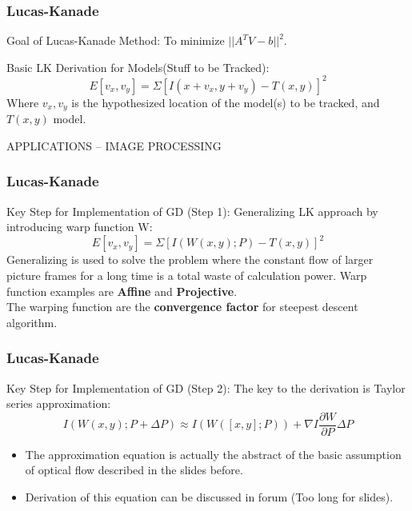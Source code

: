 \begin{frame}
\frametitle{Lucas-Kanade}
  \begin{blueblock}{Goal of Lucas-Kanade Method:}
To minimize $||A^TV - b||^2$.
  \end{blueblock}
Basic LK Derivation for Models(Stuff to be Tracked):
$$E[v_x, v_y] = \Sigma [I(x+v_x, y+v_y) - T(x, y)]^2$$
Where $v_x, v_y$ is the hypothesized location of the model(s) to be
tracked, and $T(x, y)$ model.
\end{frame}

\begin{frame}{ \LARGE APPLICATIONS -- IMAGE PROCESSING}
\frametitle{Lucas-Kanade}
  \begin{redblock}{Key Step for Implementation of GD (Step 1):}
    Generalizing LK approach by introducing warp function W:
    $$E[v_x, v_y]  = \Sigma [I(W(x, y); P) - T(x,y)]^2$$
    Generalizing is used to solve the problem where the constant flow
    of larger picture frames for a long time is a total waste of
    calculation power. Warp function examples are {\bf Affine}  and
    {\bf Projective}. \\
The warping function are the {\bf convergence factor} for steepest descent
algorithm.
  \end{redblock}
\end{frame}


\begin{frame}
\frametitle{Lucas-Kanade}
  \begin{redblock}{Key Step for Implementation of GD (Step 2):}
The key to the derivation is Taylor series approximation:
$$ I(W(x, y); P + \Delta P) \approx I(W([x, y]; P)) + \nabla I
\frac{\partial W}{\partial P}\Delta P$$
  \end{redblock}

\begin{itemize}
\item The approximation equation is actually the abstract of the basic
assumption of optical flow described in the slides before.
\item Derivation of this equation can be discussed in forum (Too long
  for slides).

\end{itemize}




\end{frame}

